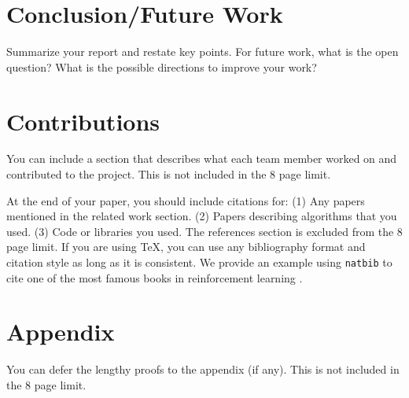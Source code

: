 \documentclass{article}
\begin{document}
\section{Conclusion/Future Work}
Summarize your report and restate key points. For future work, what is the open question? What is the possible directions to improve your work?


\section{Contributions}
You can include a section that describes what each team member worked on and contributed to the project. This is not included in the 8 page limit.


\medskip



At the end of your paper, you should include citations for: (1) Any papers mentioned in the related work section. (2) Papers describing algorithms that you used. (3) Code or libraries you used. The references section is excluded from the 8 page limit. If you are using TeX, you can use any bibliography format and citation style as long as it is consistent. We provide an example using \texttt{natbib} to cite one of the most famous books in reinforcement learning \cite{sutton2018reinforcement}.


\clearpage
\appendix
\section{Appendix}
You can defer the lengthy proofs to the appendix (if any). This is not included in the 8 page limit.
\end{document}
